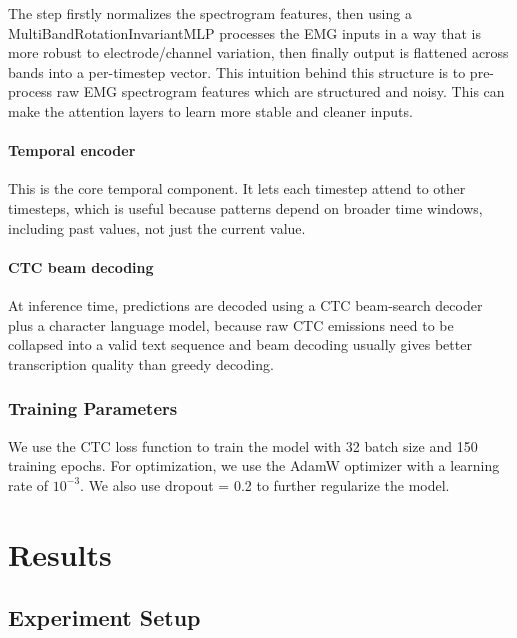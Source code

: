\documentclass{article}
\begin{document}
The step firstly normalizes the spectrogram features, then using a MultiBandRotationInvariantMLP processes the EMG inputs in a way that is more robust to electrode/channel variation, then finally output is flattened across bands into a per-timestep vector. This intuition behind this structure is to pre-process raw EMG spectrogram features which are structured and noisy. This can make the attention layers to learn more stable and cleaner inputs. 

\paragraph{Temporal encoder}

This is the core temporal component. It lets each timestep attend to other timesteps, which is useful because patterns depend on broader time windows, including past values, not just the current value. 

\paragraph{CTC beam decoding}

At inference time, predictions are decoded using a CTC beam-search decoder plus a character language model, because raw CTC emissions need to be collapsed into a valid text sequence and beam decoding usually gives better transcription quality than greedy decoding. 

\subsubsection{Training Parameters}

We use the CTC loss function to train the model with 32 batch size and 150 training epochs. For optimization, we use the AdamW optimizer with a learning rate of $10^{-3}$. We also use dropout = 0.2 to further regularize the model.

\section{Results}


\subsection{Experiment Setup}
\end{document}
